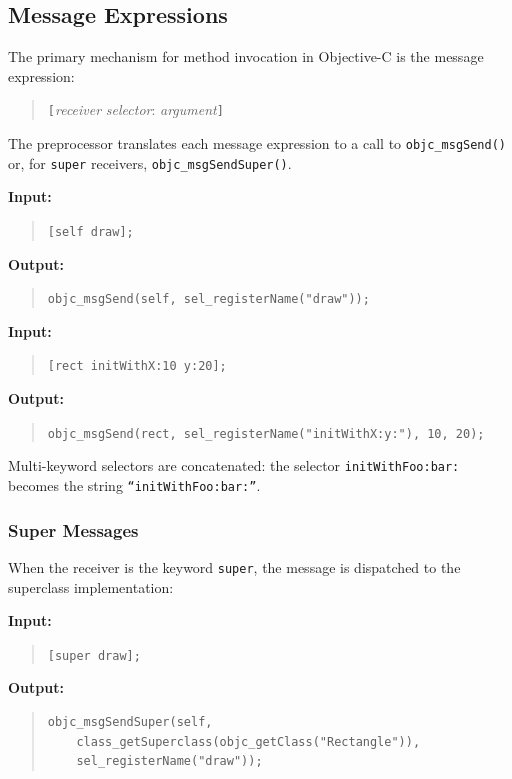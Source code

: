 \documentclass[11pt,twoside]{article}
\newcommand{\meta}[1]{{\itshape #1}}
\begin{document}
\subsection{Message Expressions}

The primary mechanism for method invocation in Objective-C is the
message expression:
\begin{quote}
{\tt [}{\meta{receiver}} {\meta{selector}}: {\meta{argument}}{\tt ]}
\end{quote}

The preprocessor translates each message expression to a call to
{\tt objc\_msgSend()} or, for {\tt super} receivers,
{\tt objc\_msgSendSuper()}.

{\bf Input:}
\begin{quote}
{\tt [self draw];}
\end{quote}

{\bf Output:}
\begin{quote}
{\tt objc\_msgSend(self, sel\_registerName("draw"));}
\end{quote}

{\bf Input:}
\begin{quote}
{\tt [rect initWithX:10 y:20];}
\end{quote}

{\bf Output:}
\begin{quote}
{\tt objc\_msgSend(rect, sel\_registerName("initWithX:y:"), 10, 20);}
\end{quote}

Multi-keyword selectors are concatenated: the selector
{\tt initWithFoo:bar:} becomes the string {\tt ``initWithFoo:bar:''}.

\subsubsection{Super Messages}

When the receiver is the keyword {\tt super}, the message is dispatched
to the superclass implementation:

{\bf Input:}
\begin{quote}
{\tt [super draw];}
\end{quote}

{\bf Output:}
\begin{quote}
\begin{verbatim}
objc_msgSendSuper(self,
    class_getSuperclass(objc_getClass("Rectangle")),
    sel_registerName("draw"));
\end{verbatim}
\end{quote}
\end{document}
